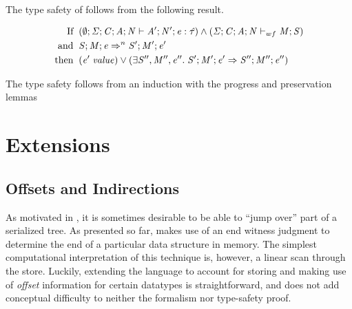 The type safety of \ourcalc{} follows from the following result.

\begin{theorem}
  \label{theorem:type-safety}
\begin{displaymath}
  \begin{aligned}
  \text{If} \;\; & (\emptyset;\mathit{\Sigma};\mathit{C};\mathit{A};\mathit{N} \vdash \mathit{A}';\mathit{N}';\mathit{e} : \mathit{\hat{\tau}}) \wedge
                   (\mathit{\Sigma};\mathit{C};\mathit{A};\mathit{N} \vdash_{wf} \mathit{M};\mathit{S}) \\
  \text{and} \;\; & \mathit{S};\mathit{M};\mathit{e} \Rightarrow^n \mathit{S}';\mathit{M}';\mathit{e}' \\
  \text{then} \;\; & (\mathit{e}' \; \mathit{value}) \vee
                     (\exists \mathit{S}'', \mathit{M}'', \mathit{e}'' . \; \mathit{S}';\mathit{M}';\mathit{e}' \Rightarrow \mathit{S}'';\mathit{M}'';\mathit{e}'')
  \end{aligned}
  \end{displaymath}
\end{theorem}

\begin{nproof}
  The type safety follows from an induction with
  the progress and preservation lemmas 
\end{nproof}

\section{Extensions}\label{sec:extensions}


\subsection{Offsets and Indirections}\label{subsec:indirections}

As motivated in , it is sometimes desirable to be
able to ``jump over'' part of a serialized tree.
%
As presented so far, \ourcalc{} makes use of an end witness judgment
to determine the end of a particular data structure in memory.
%
The simplest computational interpretation of this technique is,
however, a linear scan through the store.
%
Luckily, extending the language to account for storing and making use
of \emph{offset} information for certain datatypes is
straightforward, and does not add conceptual difficulty to
neither the formalism nor type-safety proof.

